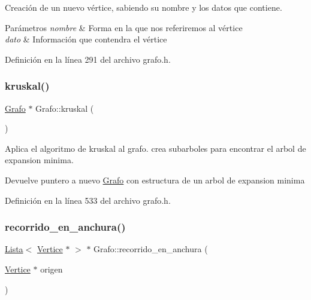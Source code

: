 Creación de un nuevo vértice, sabiendo su nombre y los datos que contiene. 


\begin{DoxyParams}{Parámetros}
{\em nombre} & Forma en la que nos referiremos al vértice \\
\hline
{\em dato} & Información que contendra el vértice \\
\hline
\end{DoxyParams}


Definición en la línea 291 del archivo grafo.\+h.

\mbox{\label{classGrafo_aa2ab9a12d473f6830af554efad5b438d}} 
\subsubsection{\texorpdfstring{kruskal()}{kruskal()}}
{\footnotesize\ttfamily \hyperlink{classGrafo}{Grafo} $\ast$ Grafo\+::kruskal (\begin{DoxyParamCaption}{ }\end{DoxyParamCaption})}



Aplica el algoritmo de kruskal al grafo. crea subarboles para encontrar el arbol de expansion minima. 

\begin{DoxyReturn}{Devuelve}
puntero a nuevo \hyperlink{classGrafo}{Grafo} con estructura de un arbol de expansion minima 
\end{DoxyReturn}


Definición en la línea 533 del archivo grafo.\+h.

\mbox{\label{classGrafo_a1c65e0f7cbbf74cd690b5eddf220728d}} 
\subsubsection{\texorpdfstring{recorrido\+\_\+en\+\_\+anchura()}{recorrido\_en\_anchura()}}
{\footnotesize\ttfamily \hyperlink{classLista}{Lista}$<$ \hyperlink{classVertice}{Vertice} $\ast$ $>$ $\ast$ Grafo\+::recorrido\+\_\+en\+\_\+anchura (\begin{DoxyParamCaption}\item[{\hyperlink{classVertice}{Vertice} $\ast$}]{origen }\end{DoxyParamCaption})}



